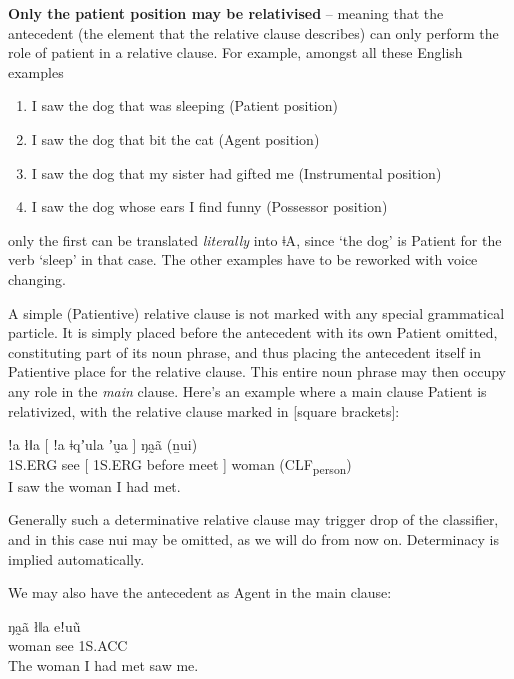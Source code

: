 \documentclass[11pt,a5paper]{book}
\newcommand{\qcn}[1]{\textcolor{AccentText}{\large#1}}
\newcommand{\langname}{\qcn{ǂA}}
\newcommand{\grammsc}[1]{\textsc{#1}}
\newcommand{\CLF}[1]{\grammsc{CLF}\textsubscript{#1}}
\newcommand{\ERG}{\grammsc{ERG}}
\newcommand{\ACC}{\grammsc{ACC}}
\begin{document}
\textbf{Only the patient position may be relativised} -- meaning that the antecedent (the element that the relative clause describes) can only perform the role of patient in a relative clause. For example, amongst all these English examples

\begin{enumerate}
\item I saw the dog that was sleeping (Patient position)
\item I saw the dog that bit the cat (Agent position)
\item I saw the dog that my sister had gifted me (Instrumental position)
\item I saw the dog whose ears I find funny (Possessor position)
\end{enumerate}

only the first can be translated \emph{literally} into \langname{}, since `the dog' is Patient for the verb `sleep' in that case. The other examples have to be reworked with voice changing.

A simple (Patientive) relative clause is not marked with any special grammatical particle. It is simply placed before the antecedent with its own Patient omitted, constituting part of its noun phrase, and thus placing the antecedent itself in Patientive place for the relative clause. This entire noun phrase may then occupy any role in the \emph{main} clause. Here's an example where a main clause Patient is relativized, with the relative clause marked in [square brackets]:

\begin{exe}
\ex
\gll ǃa łǁa [ ǃa ǂqʼula ʼṵa ] ŋa̰ã (ṉui) \\
1S.\ERG{} see [ 1S.\ERG{} before meet ] woman (\CLF{person}) \\
\glt I saw the woman I had met.
\end{exe}

Generally such a determinative relative clause may trigger drop of the classifier, and in this case \qcn{nui} may be omitted, as we will do from now on. Determinacy is implied automatically.

We may also have the antecedent as Agent in the main clause:

\begin{exe}
\ex
{} ŋa̰ã łǁa eǃuũ \\
[ 1S.\ERG{} before meet ] woman see 1S.\ACC{} \\
\glt The woman I had met saw me.
\end{exe}
\end{document}
